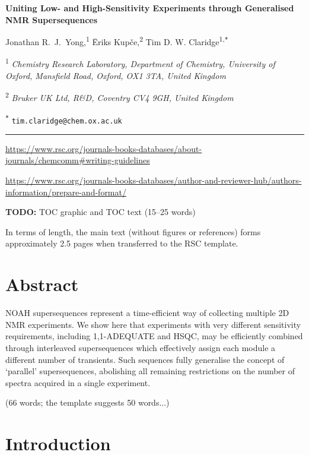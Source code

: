 \documentclass[a4paper,12pt]{article}
\newcommand{\articletitle}{\todo{Uniting Low- and High-Sensitivity Experiments through Generalised NMR Supersequences}}
\newcommand{\crl}{Chemistry Research Laboratory, Department of Chemistry, University of Oxford, Mansfield Road, Oxford, OX1 3TA, United Kingdom}
\newcommand{\brukeruk}{Bruker UK Ltd, R\&D, Coventry CV4 9GH, United Kingdom}
\newcommand{\todo}[1]{{\color{OrangeRed}#1}}
\begin{document}
\begin{refsection}

\begin{center}   %
    \textbf{\Large \articletitle{}}

    \vspace{0.2cm}

    Jonathan R.\ J.\ Yong,\textsuperscript{1} {\=E}riks Kup{\v{c}}e,\textsuperscript{2} Tim D. W. Claridge\textsuperscript{1,\texttt{*}}

    \vspace{0.2cm}

    \textsuperscript{1} \textit{\crl{}}

    \textsuperscript{2} \textit{\brukeruk{}}

    \textsuperscript{\texttt{*}} \texttt{tim.claridge@chem.ox.ac.uk}

    \vspace{0.5cm} \hrule

\end{center}

\small{
    \url{https://www.rsc.org/journals-books-databases/about-journals/chemcomm#writing-guidelines}

    \url{https://www.rsc.org/journals-books-databases/author-and-reviewer-hub/authors-information/prepare-and-format/}
}

\todo{\textbf{TODO:} TOC graphic and TOC text (15--25 words)}

\todo{In terms of length, the main text (without figures or references) forms approximately 2.5 pages when transferred to the RSC template.}

\section*{Abstract}

NOAH supersequences represent a time-efficient way of collecting multiple 2D NMR experiments. 
We show here that experiments with very different sensitivity requirements, including 1,1-ADEQUATE and HSQC, may be efficiently combined through interleaved supersequences which effectively assign each module a different number of transients.
Such sequences fully generalise the concept of `parallel' supersequences, abolishing all remaining restrictions on the number of spectra acquired in a single experiment.

\todo{(66 words; the template suggests 50 words...)}

\section{Introduction}


\end{refsection}
\end{document}
